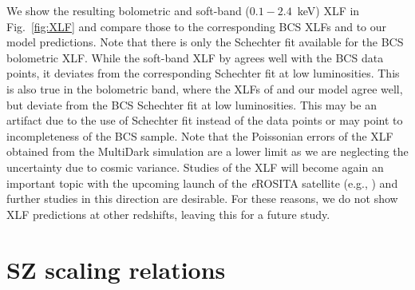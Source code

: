 \documentclass[useAMS,usenatbib]{mn2e}
\begin{document}
We show the resulting bolometric and soft-band ($0.1-2.4$~keV) XLF in
Fig.~\ref{fig:XLF} and compare those to the corresponding BCS XLFs and to our
model predictions. Note that there is only the Schechter fit available for the
BCS bolometric XLF.  While the soft-band XLF by \cite{2010MNRAS.406.1773M}
agrees well with the BCS data points, it deviates from the corresponding
Schechter fit at low luminosities. This is also true in the bolometric band,
where the XLFs of \cite{2010MNRAS.406.1773M} and our model agree well, but
deviate from the BCS Schechter fit at low luminosities. This may be an artifact
due to the use of Schechter fit instead of the data points or may point to
incompleteness of the BCS sample. Note that the Poissonian errors of the XLF
obtained from the MultiDark simulation are a lower limit as we are neglecting
the uncertainty due to cosmic variance.  Studies of the XLF will become again an
important topic with the upcoming launch of the \emph{e}ROSITA satellite (e.g.,
\citealp{2011MSAIS..17..159C}) and further studies in this direction are
desirable. For these reasons, we do not show XLF predictions at other redshifts,
leaving this for a future study.


\section{SZ scaling relations}
\label{sec:5}
\end{document}
